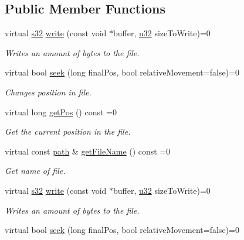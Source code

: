 \subsection*{Public Member Functions}
\begin{DoxyCompactItemize}
\item 
virtual \hyperlink{namespaceirr_ac66849b7a6ed16e30ebede579f9b47c6}{s32} \hyperlink{classirr_1_1io_1_1IWriteFile_a32ce2fb186c4a21fcf3c85adb13c7c77}{write} (const void $\ast$buffer, \hyperlink{namespaceirr_a0416a53257075833e7002efd0a18e804}{u32} size\+To\+Write)=0
\begin{DoxyCompactList}\small\item\em Writes an amount of bytes to the file. \end{DoxyCompactList}\item 
virtual bool \hyperlink{classirr_1_1io_1_1IWriteFile_ad68289024b2a2079fce20ca9b95c9519}{seek} (long final\+Pos, bool relative\+Movement=false)=0
\begin{DoxyCompactList}\small\item\em Changes position in file. \end{DoxyCompactList}\item 
virtual long \hyperlink{classirr_1_1io_1_1IWriteFile_a062eaf082b6f4d05cf0e44b85aa7a6ab}{get\+Pos} () const =0
\begin{DoxyCompactList}\small\item\em Get the current position in the file. \end{DoxyCompactList}\item 
virtual const \hyperlink{namespaceirr_1_1io_a6468281622ce3a1c46b72e19f32dded5}{path} \& \hyperlink{classirr_1_1io_1_1IWriteFile_ad129ab8feac03f06f2edf685df6a0236}{get\+File\+Name} () const =0
\begin{DoxyCompactList}\small\item\em Get name of file. \end{DoxyCompactList}\item 
virtual \hyperlink{namespaceirr_ac66849b7a6ed16e30ebede579f9b47c6}{s32} \hyperlink{classirr_1_1io_1_1IWriteFile_a32ce2fb186c4a21fcf3c85adb13c7c77}{write} (const void $\ast$buffer, \hyperlink{namespaceirr_a0416a53257075833e7002efd0a18e804}{u32} size\+To\+Write)=0
\begin{DoxyCompactList}\small\item\em Writes an amount of bytes to the file. \end{DoxyCompactList}\item 
virtual bool \hyperlink{classirr_1_1io_1_1IWriteFile_ad68289024b2a2079fce20ca9b95c9519}{seek} (long final\+Pos, bool relative\+Movement=false)=0

\end{DoxyCompactItemize}
